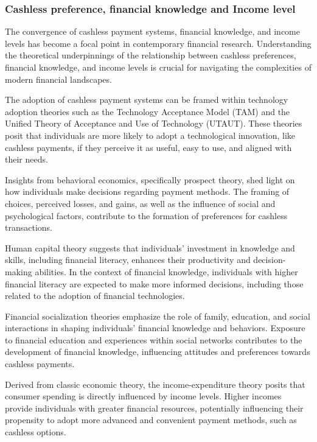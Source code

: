 \documentclass[
  super,
  preprint,
  3p]{elsarticle}
\begin{document}
\hypertarget{cashless-preference-financial-knowledge-and-income-level}{%
\subsubsection{Cashless preference, financial knowledge and Income
level}\label{cashless-preference-financial-knowledge-and-income-level}}

The convergence of cashless payment systems, financial knowledge, and
income levels has become a focal point in contemporary financial
research. Understanding the theoretical underpinnings of the
relationship between cashless preferences, financial knowledge, and
income levels is crucial for navigating the complexities of modern
financial landscapes.

The adoption of cashless payment systems can be framed within technology
adoption theories such as the Technology Acceptance Model (TAM) and the
Unified Theory of Acceptance and Use of Technology (UTAUT). These
theories posit that individuals are more likely to adopt a technological
innovation, like cashless payments, if they perceive it as useful, easy
to use, and aligned with their needs.

Insights from behavioral economics, specifically prospect theory, shed
light on how individuals make decisions regarding payment methods. The
framing of choices, perceived losses, and gains, as well as the
influence of social and psychological factors, contribute to the
formation of preferences for cashless transactions.

Human capital theory suggests that individuals' investment in knowledge
and skills, including financial literacy, enhances their productivity
and decision-making abilities. In the context of financial knowledge,
individuals with higher financial literacy are expected to make more
informed decisions, including those related to the adoption of financial
technologies.

Financial socialization theories emphasize the role of family,
education, and social interactions in shaping individuals' financial
knowledge and behaviors. Exposure to financial education and experiences
within social networks contributes to the development of financial
knowledge, influencing attitudes and preferences towards cashless
payments.

Derived from classic economic theory, the income-expenditure theory
posits that consumer spending is directly influenced by income levels.
Higher incomes provide individuals with greater financial resources,
potentially influencing their propensity to adopt more advanced and
convenient payment methods, such as cashless options.
\end{document}
